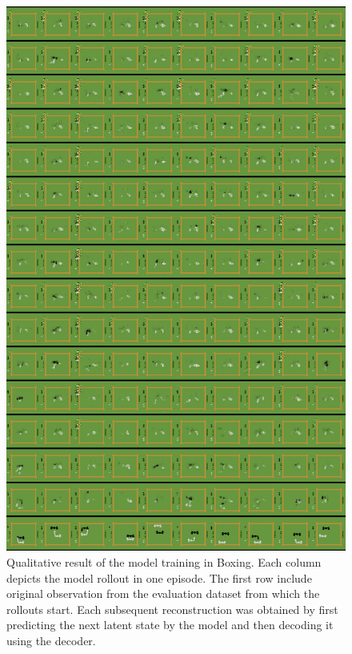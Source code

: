 \begin{figure}[H]
\includegraphics[height=0.9\textheight,keepaspectratio]{figures/PlaNet/Boxing_memory_original.png}
\caption[Qualitative result of the original PlaNet model training in Boxing]{Qualitative result of the model training in Boxing. Each column depicts the model rollout in one episode. The first row include original observation from the evaluation dataset from which the rollouts start. Each subsequent reconstruction was obtained by first predicting the next latent state by the model and then decoding it using the decoder.}
\label{Fig.PlaNet_Boxing_original}
\end{figure}

